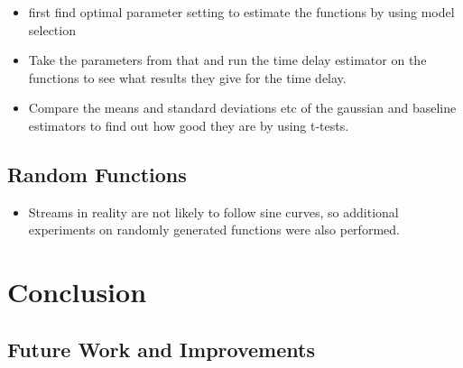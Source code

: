 \documentclass[a4paper,11pt]{article}
\begin{document}
\begin{itemize}
\item first find optimal parameter setting to estimate the functions by using
     model selection
\item Take the parameters from that and run the time delay estimator on the
     functions to see what results they give for the time delay.
\item Compare the means and standard deviations etc of the gaussian and baseline
     estimators to find out how good they are by using t-tests.
\end{itemize}
\subsection{Random Functions}
\label{sec-7-2}

\begin{itemize}
\item Streams in reality are not likely to follow sine curves, so additional
     experiments on randomly generated functions were also performed.
\end{itemize}
\section{Conclusion}
\label{sec-8}
\subsection{Future Work and Improvements}
\label{sec-8-1}
\end{document}

